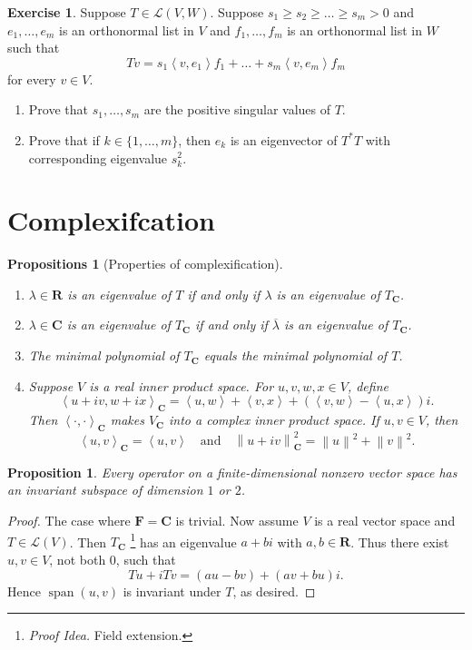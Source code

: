 \documentclass[nofonts,colorlinks]{tufte-handout}
\theoremstyle{plain} %
\newtheorem{prop}[thm]{Proposition}
\newtheorem{props}[thm]{Propositions}
\theoremstyle{definition}
\newtheorem{exer}[thm]{Exercise}
\theoremstyle{remark}
\def\idea{\textit{\color[rgb]{0,0,.55}Proof Idea. }}
\newcommand{\norm}[1]{\mathopen{}\left\lVert#1\right\rVert}
\newcommand{\inp}[2]{\mathopen{}\left\langle#1,#2\right\rangle}
\newcommand{\R}{\mathbf{R}}
\newcommand{\C}{\mathbf{C}}
\newcommand{\F}{\mathbf{F}}
\renewcommand{\L}{\mathcal{L}}
\DeclareMathOperator{\spn}{span}
\begin{document}
\begin{exer}
	Suppose $T\in\L(V,W)$. Suppose $s_1\geq s_2\geq\dots\geq s_m>0$ and $e_1,\dots,e_m$ is an orthonormal list in $V$ and $f_1,\dots,f_m$ is an orthonormal list in $W$ such that
	\[Tv=s_1\inp{v}{e_1}f_1+\dots+s_m\inp{v}{e_m}f_m\]
	for every $v\in V$.
	\begin{enumerate}
		\item Prove that $s_1,\dots,s_m$ are the positive singular values of $T$.
		\item Prove that if $k\in\{1,\dots,m\}$, then $e_k$ is an eigenvector of $T^*T$ with corresponding eigenvalue $s_k^2$.
	\end{enumerate}
\end{exer}


\section{Complexifcation}
\begin{props}[Properties of complexification]
	\begin{enumerate}
		\item $\lambda\in\R$ is an eigenvalue of $T$ if and only if $\lambda$ is an eigenvalue of $T_{\C}$.
		\item $\lambda\in\C$ is an eigenvalue of $T_{\C}$ if and only if $\overline{\lambda}$ is an eigenvalue of $T_{\C}$.
		\item The minimal polynomial of $T_{\C}$ equals the minimal polynomial of $T$.
		\item Suppose $V$ is a real inner product space. For $u,v,w,x\in V$, define
		\[\inp{u+iv}{w+ix}_{\C}=\inp{u}{w}+\inp{v}{x}+(\inp{v}{w}-\inp{u}{x})i.\]
		Then $\inp{\cdot}{\cdot}_{\C}$ makes $V_{\C}$ into a complex inner product space. If $u,v\in V$, then
		\[\inp{u}{v}_{\C}=\inp{u}{v}\quad\text{and}\quad\norm{u+iv}_{\C}^2=\norm{u}^2+\norm{v}^2.\]
	\end{enumerate}
\end{props}

\begin{prop}
	Every operator on a finite-dimensional nonzero vector space has an invariant subspace of dimension $1$ or $2$.
\end{prop}
\begin{proof}
	The case where $\F=\C$ is trivial. Now assume $V$ is a real vector space and $T\in\L(V)$. Then $T_{\C}$%
	\footnote{\idea Field extension.}
	has an eigenvalue $a+bi$ with $a,b\in\R$. Thus there exist $u,v\in V$, not both $0$, such that
	\[Tu+iTv=(au-bv)+(av+bu)i.\]
	Hence $\spn(u,v)$ is invariant under $T$, as desired.
\end{proof}
\end{document}
